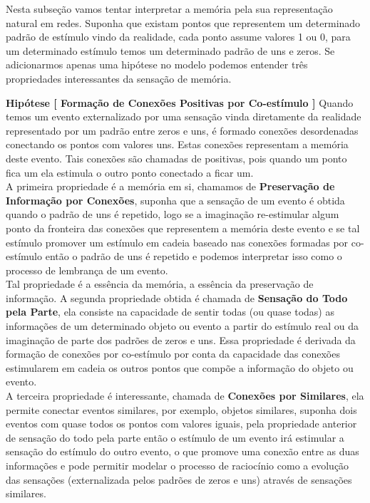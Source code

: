 \documentclass[10pt,a4paper]{report}
\begin{document}
\hspace{\baselineskip}

Nesta subseção vamos tentar interpretar a memória pela sua representação natural em redes. Suponha que existam pontos que representem um determinado padrão de estímulo vindo da realidade, cada ponto assume valores 1 ou 0, para um determinado estímulo temos um determinado padrão de uns e zeros. Se adicionarmos apenas uma hipótese no modelo podemos entender três propriedades interessantes da sensação de memória.

\hspace{\baselineskip}

\textbf{Hipótese [ Formação de Conexões Positivas por Co-estímulo ]} Quando temos um evento externalizado por uma sensação vinda diretamente da realidade representado por um padrão entre zeros e uns, é formado conexões desordenadas conectando os pontos com valores uns. Estas conexões representam a memória deste evento. Tais conexões são chamadas de positivas, pois quando um ponto fica um ela estimula o outro ponto conectado a ficar um. \\

A primeira propriedade é a memória em si, chamamos de \textbf{Preservação de Informação por Conexões}, suponha que a sensação de um evento é obtida quando o padrão de uns é repetido, logo se a imaginação re-estimular algum ponto da fronteira das conexões que representem a memória deste evento e se tal estímulo promover um estímulo em cadeia baseado nas conexões formadas por co-estímulo então o padrão de uns é repetido e podemos interpretar isso como o processo de lembrança de um evento.\\

Tal propriedade é a essência da memória, a essência da preservação de informação. A segunda propriedade obtida é chamada de \textbf{Sensação do Todo pela Parte}, ela consiste na capacidade de sentir todas (ou quase todas) as informações de um determinado objeto ou evento a partir do estímulo real ou da imaginação de parte dos padrões de zeros e uns. Essa propriedade é derivada da formação de conexões por co-estímulo por conta da capacidade das conexões estimularem em cadeia os outros pontos que compõe a informação do objeto ou evento.\\

A terceira propriedade é interessante, chamada de \textbf{Conexões por Similares}, ela permite conectar eventos similares, por exemplo, objetos similares, suponha dois eventos com quase todos os pontos com valores iguais, pela propriedade anterior de sensação do todo pela parte então o estímulo de um evento irá estimular a sensação do estímulo do outro evento, o que promove uma conexão entre as duas informações e pode permitir modelar o processo de raciocínio como a evolução das sensações (externalizada pelos padrões de zeros e uns) através de sensações similares.\\
\end{document}

